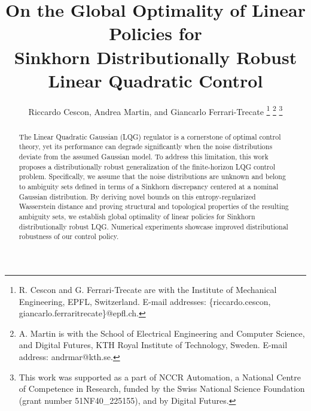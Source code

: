 \documentclass[letterpaper, 10 pt, conference]{ieeeconf}  %
\title{\LARGE \bf On the Global Optimality of Linear Policies for \\Sinkhorn Distributionally Robust Linear Quadratic Control
}
\author{Riccardo Cescon, Andrea Martin, and Giancarlo Ferrari-Trecate
\thanks{R. Cescon and G. Ferrari-Trecate
are with the Institute of Mechanical Engineering, EPFL, Switzerland. E-mail addresses: \{riccardo.cescon, giancarlo.ferraritrecate\}@epfl.ch.}
\thanks{A. Martin is with the School of
Electrical Engineering and Computer Science, and Digital Futures, KTH Royal Institute of Technology, Sweden. E-mail address: andrmar@kth.se.}
\thanks{This work was supported as a part of NCCR Automation, a National Centre of Competence in Research, funded by the Swiss National Science Foundation (grant number 51NF40\_225155), and by Digital Futures.}
}
\theoremstyle{ieeeconf}
\begin{document}
\maketitle

\thispagestyle{empty}
\pagestyle{empty}

\begin{abstract}
The Linear Quadratic Gaussian (LQG) regulator is a cornerstone of optimal control theory, yet its performance can degrade significantly when the noise distributions deviate from the assumed Gaussian model. To address this limitation, this work proposes a distributionally robust generalization of the finite-horizon LQG control problem. Specifically, we assume that the noise distributions are unknown and belong to ambiguity sets defined in terms of a Sinkhorn discrepancy centered at a nominal Gaussian distribution. By deriving novel bounds on this entropy-regularized Wasserstein distance and proving structural and topological properties of the resulting ambiguity sets, we establish global optimality of linear policies for Sinkhorn distributionally robust LQG. Numerical experiments showcase improved distributional robustness of our control policy.


\end{abstract}
\end{document}
